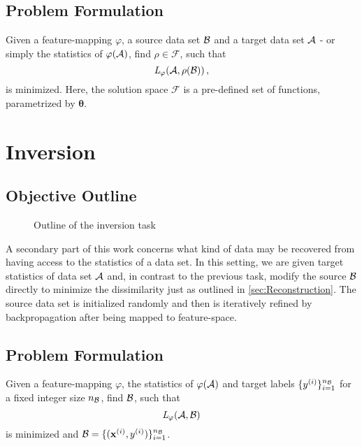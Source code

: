 \subsection{Problem Formulation}
Given a feature-mapping $\varphi$, a source data set $\mathcal B$ and a target data set $\mathcal A$ - or simply the statistics of $\varphi(\mathcal A)$,  find $\rho \in \mathcal{F}$, such that
\[
     \textit{L} _\varphi (\mathcal A, \rho(\mathcal B)) \,,
\]
is minimized.
Here, the solution space $\mathcal F$ is a pre-defined set of functions, 
parametrized by $\boldsymbol \theta$.






\section{Inversion}
\label{sec:Inversion}

\subsection{Objective Outline}

\begin{figure}[h]
    \centering
    
    \caption{Outline of the inversion task}
    \label{fig:inversion_outline}
    \centering
\end{figure}

A secondary part of this work concerns what kind of data 
may be recovered from having access to the statistics of a data set.
In this setting, we are given target statistics of data set $\mathcal A$
and, in contrast to the previous task, modify the source $\mathcal B$ directly to 
minimize the dissimilarity just as outlined in \cref{sec:Reconstruction}.
The source data set is initialized randomly and then is 
iteratively refined by backpropagation after being mapped to feature-space.



\subsection{Problem Formulation}
Given a feature-mapping $\varphi$, the statistics of $\varphi(\mathcal A)$
and target labels $\{y^{(i)}\}_{i=1}^{n_{\mathcal B}}$ for a fixed integer size $n_{\mathcal B}$,
find $\mathcal B$, such that
\[
     \textit{L} _\varphi (\mathcal A, \mathcal B)
\]
is minimized and $\mathcal B = \{(\mathbf x^{(i)}, y^{(i)})\}_{i=1}^{n_{\mathcal B}}$.

